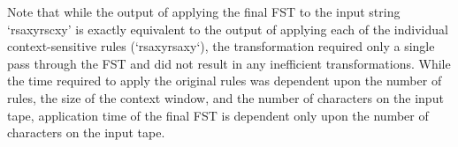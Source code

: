 Note that while the output of applying the final FST to the input string ‘rsaxyrscxy’ is exactly equivalent to the output of applying each of the individual context-sensitive rules (‘rsaxyrsaxy‘), the transformation required only a single pass through the FST and did not result in any inefficient transformations. While the time required to apply the original rules was dependent upon the number of rules, the size of the context window, and the number of characters on the input tape, application time of the final FST is dependent only upon the number of characters on the input tape.
